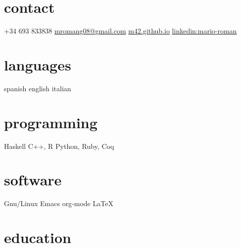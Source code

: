 \documentclass[]{friggeri-cv-a4}
\begin{document}

\begin{aside} %
\section{contact}
+34 693 833838
\href{mailto:mromang08@gmail.com}{mromang08@gmail.com}
\href{https://m42.github.io}{m42.github.io}
\href{https://www.linkedin.com/in/mario-roman}{linkedin:mario-roman}
\section{languages}
spanish
english
italian
\section{programming}
Haskell
C++, R
Python, Ruby, Coq
\section{software}
Gnu/Linux
Emacs org-mode
LaTeX
\end{aside}



\section{education}
\end{document}
